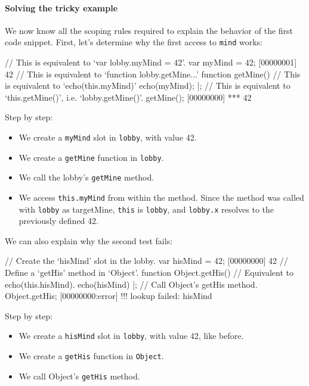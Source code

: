 \paragraph{Solving the tricky example}
We now know all the scoping rules required to explain the behavior of
the first code snippet. First, let's determine why the first access to
\lstinline|mind| works:

\begin{urbiscript}
// This is equivalent to `var lobby.myMind = 42'.
var myMind = 42;
[00000001] 42
// This is equivalent to `function lobby.getMine...'
function getMine()
{
  // This is equivalent to `echo(this.myMind)'
  echo(myMind);
}|;
// This is equivalent to `this.getMine()', i.e. `lobby.getMine()'.
getMine();
[00000000] *** 42
\end{urbiscript}

Step by step:
\begin{itemize}
\item We create a \lstinline|myMind| slot in \lstinline|lobby|, with
  value 42.
\item We create a \lstinline|getMine| function in \lstinline|lobby|.
\item We call the lobby's \lstinline|getMine| method.
\item We access \lstinline|this.myMind| from within the method. Since
  the method was called with \lstinline|lobby| as targetMine,
  \lstinline|this| is \lstinline|lobby|, and \lstinline|lobby.x|
  resolves to the previously defined 42.
\end{itemize}

We can also explain why the second test fails:

\begin{urbiscript}
// Create the `hisMind' slot in the lobby.
var hisMind = 42;
[00000000] 42
// Define a `getHis' method in `Object'.
function Object.getHis()
{
  // Equivalent to echo(this.hisMind).
  echo(hisMind)
}|;
// Call Object's getHis method.
Object.getHis;
[00000000:error] !!! lookup failed: hisMind
\end{urbiscript}

Step by step:
\begin{itemize}
\item We create a \lstinline|hisMind| slot in \lstinline|lobby|, with
  value 42, like before.
\item We create a \lstinline|getHis| function in \lstinline|Object|.
\item We call Object's \lstinline|getHis| method.
\end{itemize}

